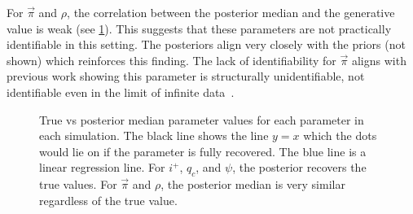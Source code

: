 \documentclass[thesis.tex]{subfiles}
\begin{document}
For $\vec{\pi}$ and $\rho$, the correlation between the posterior median and the generative value is weak (see \cref{SEIR:fig:true-vs-posterior}).
This suggests that these parameters are not practically identifiable in this setting.
The posteriors align very closely with the priors (not shown) which reinforces this finding.
The lack of identifiability for $\vec{\pi}$ aligns with previous work showing this parameter is structurally unidentifiable, \ie not identifiable even in the limit of infinite data~\autocite{dankwaStructural}.
\begin{figure}
    \caption[True vs posterior parameter values]{%
        True vs posterior median parameter values for each parameter in each simulation.
        The black line shows the line $y = x$ which the dots would lie on if the parameter is fully recovered.
        The blue line is a linear regression line.
        For $i^+$, $q_c$, and $\psi$, the posterior recovers the true values.
        For $\vec{\pi}$ and $\rho$, the posterior median is very similar regardless of the true value.
    }
    \label{SEIR:fig:true-vs-posterior}
\end{figure}
\end{document}
